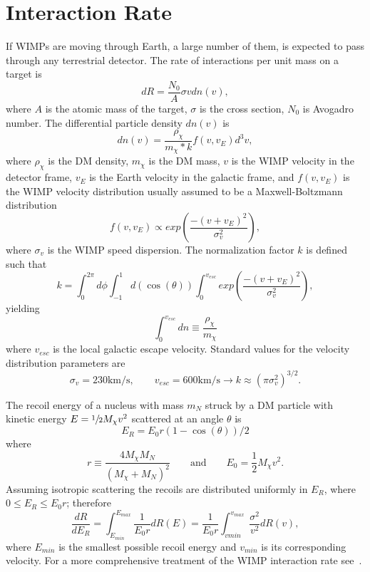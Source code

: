 \section{Interaction Rate}
If WIMPs are moving through Earth, a large number of them, is expected to pass through any terrestrial detector. The rate of interactions per unit mass on a target is
\begin{equation}
dR = \frac{N_0}{A}\sigma v dn(v),
\end{equation} 
where $A$ is the atomic mass of the target, $\sigma$ is the cross section, $N_0$ is Avogadro number. The differential particle density $dn(v)$ is
\begin{equation}
dn(v) = \frac{\rho_{\chi}}{m_{\chi}*k} f(v,v_E)d^3 v,
\end{equation}
where $\rho_\chi$ is the DM density, $m_\chi$ is the DM mass, $v$ is the WIMP velocity in the detector frame, $v_E$ is the Earth velocity in the galactic frame, and $f(v,v_E)$ is the WIMP velocity distribution usually assumed to be a Maxwell-Boltzmann distribution
\begin{equation}
f(v,v_E) \propto exp\left(\frac{-(v+v_E)^2}{\sigma_v ^2}\right),
\end{equation} 
where $\sigma_v$ is the WIMP speed dispersion. The normalization factor $k$ is defined such that
\begin{equation}
k = \int_0^{2\pi}d\phi \int_{-1}^1d(\cos(\theta)) \int_0^{v_{esc}} exp\left(\frac{-(v+v_E)^2}{\sigma_v ^2}\right),
\end{equation}
yielding
\begin{equation}
\int_0^{v_{esc}} dn \equiv \frac{\rho_\chi}{m_\chi} 
\end{equation}
where $v_{esc}$ is the  local galactic escape velocity. Standard values for the velocity distribution parameters are
\begin{equation}
\sigma_v = 230\mathrm{km/s}, \qquad v_{esc} = 600\mathrm{km/s} \rightarrow k \approx (\pi \sigma_v^2)^{3/2}.
\end{equation} 

The recoil energy of a nucleus with mass $m_N$ struck by a DM particle with kinetic energy $E = \sfrac{1}{2}M_\chi v^2$ scattered at an angle $\theta$ is
\begin{equation}
E_R = E_0r(1-\cos(\theta))/2
\end{equation}
where
\begin{equation*}
r \equiv \frac{4M_\chi M_N}{(M_\chi + M_N)^2} \qquad \mathrm{and} \qquad E_0=\frac{1}{2}M_\chi v^2.
\end{equation*} 
Assuming isotropic scattering the recoils are distributed uniformly in $E_R$, where $0 \leq E_R \leq E_0 r$; therefore
\begin{equation}
\frac{dR}{dE_R} = \int_{E_{min}}^{E_{max}} \frac{1}{E_0 r}dR(E) = \frac{1}{E_0r}\int_{v{min}}^{v_{max}}\frac{\sigma^2}{v^2}dR(v),
\end{equation} 
where $E_{min}$ is the smallest possible recoil energy and $v_{min}$ is its corresponding velocity. For a more comprehensive treatment of the WIMP interaction rate see~\cite{LEWIN}.




